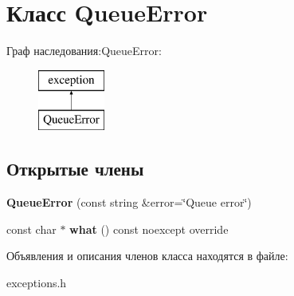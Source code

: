 \hypertarget{class_queue_error}{}\section{Класс Queue\+Error}
\label{class_queue_error}
Граф наследования\+:Queue\+Error\+:\begin{figure}[H]
\begin{center}
\leavevmode
\includegraphics[height=2.000000cm]{class_queue_error}
\end{center}
\end{figure}
\subsection*{Открытые члены}
\begin{DoxyCompactItemize}
\item 
\mbox{\label{class_queue_error_a75b1c2766da17c9e1385c94caa0e5dfa}} 
{\bfseries Queue\+Error} (const string \&error=\char`\"{}Queue error\char`\"{})
\item 
\mbox{\label{class_queue_error_a7b8052680dcd81aeeb8e901d5698b2de}} 
const char $\ast$ {\bfseries what} () const noexcept override
\end{DoxyCompactItemize}


Объявления и описания членов класса находятся в файле\+:\begin{DoxyCompactItemize}
\item 
exceptions.\+h\end{DoxyCompactItemize}
